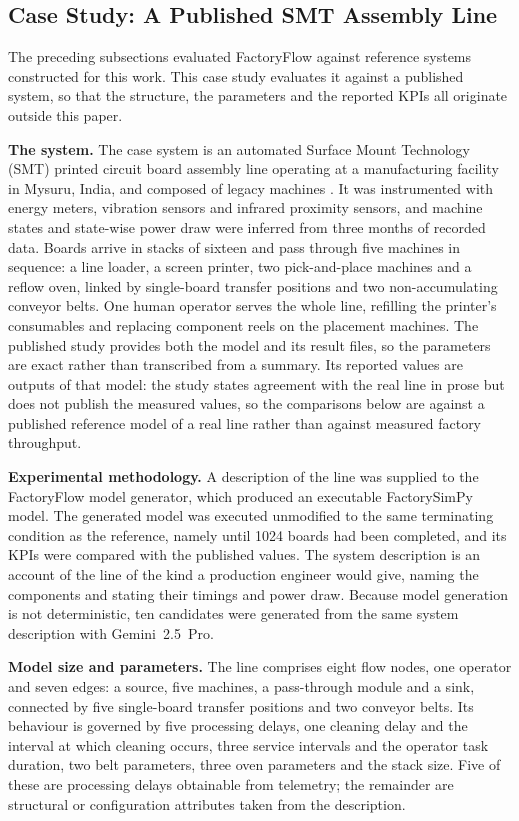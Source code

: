 \subsection{Case Study: A Published SMT Assembly Line}
\label{subsec:smt_case_study}

The preceding subsections evaluated FactoryFlow against reference systems constructed for
this work. This case study evaluates it against a published system, so that the structure,
the parameters and the reported KPIs all originate outside this paper.

\noindent\textbf{The system.} The case system is an automated Surface Mount Technology
(SMT) printed circuit board assembly line operating at a manufacturing facility in Mysuru,
India, and composed of legacy machines \cite{KaranjkarSMT2018}. It was instrumented with
energy meters, vibration sensors and infrared proximity sensors, and machine states and
state-wise power draw were inferred from three months of recorded data. Boards arrive in
stacks of sixteen and pass through five machines in sequence: a line loader, a screen
printer, two pick-and-place machines and a reflow oven, linked by single-board transfer
positions and two non-accumulating conveyor belts. One human operator serves the whole
line, refilling the printer's consumables and replacing component reels on the placement
machines. The published study provides both the model and its result files, so the
parameters are exact rather than transcribed from a summary. Its reported values are
outputs of that model: the study states agreement with the real line in prose but does not
publish the measured values, so the comparisons below are against a published reference
model of a real line rather than against measured factory throughput.

\noindent\textbf{Experimental methodology.} A description of the line was supplied to the
FactoryFlow model generator, which produced an executable FactorySimPy model. The
generated model was executed unmodified to the same terminating condition as the
reference, namely until 1024 boards had been completed, and its KPIs were compared with
the published values. The system description is an account of the line of the kind a
production engineer would give, naming the components and stating their timings and power
draw. Because model generation is not deterministic, ten candidates were generated from
the same system description with Gemini~2.5~Pro.

\noindent\textbf{Model size and parameters.} The line comprises eight flow nodes, one
operator and seven edges: a source, five machines, a pass-through module and a sink,
connected by five single-board transfer positions and two conveyor belts. Its behaviour is
governed by five processing delays, one cleaning delay and the interval at which cleaning
occurs, three service intervals and the operator task duration, two belt parameters, three
oven parameters and the stack size. Five of these are processing delays obtainable from
telemetry; the remainder are structural or configuration attributes taken from the
description.

